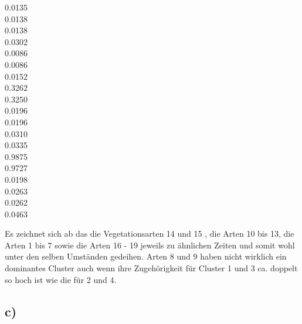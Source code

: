 0.0135      \\
0.0138      \\
0.0138      \\
0.0302      \\
0.0086      \\
0.0086      \\
0.0152      \\
0.3262      \\
0.3250      \\
0.0196      \\
0.0196      \\
0.0310      \\
0.0335      \\
0.9875      \\
0.9727      \\
0.0198      \\
0.0263      \\
0.0262      \\
0.0463      

\hfill

Es zeichnet sich ab das die Vegetationsarten 14 und 15 , die Arten 10 bis 13, die Arten 1 bis 7 sowie die Arten 16 - 19 jeweils zu ähnlichen Zeiten und somit wohl unter den selben Umständen gedeihen.
Arten 8 und 9 haben nicht wirklich ein dominantes Cluster auch wenn ihre Zugehörigkeit für Cluster 1 und 3 ca. doppelt so hoch ist wie die für 2 und 4.


\subsection*{c)}

